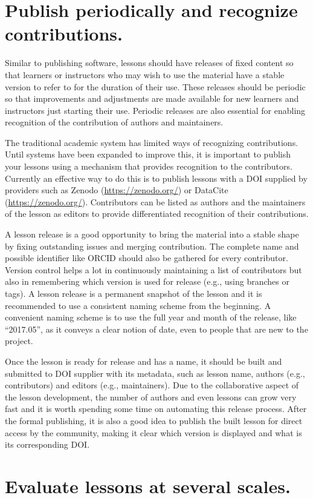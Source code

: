 \documentclass[10pt,letterpaper]{article}
\newcommand{\rulemajor}[1]{\section{#1}}
\begin{document}
\rulemajor{Publish periodically and recognize contributions.}

Similar to publishing software,
lessons should have releases of fixed content
so that learners or instructors who may wish to use the material have a stable version to refer to
for the duration of their use.
These releases should be periodic
so that improvements and adjustments are made available
for new learners and instructors just starting their use.
Periodic releases are also essential
for enabling recognition of the contribution of authors and maintainers.

The traditional academic system has limited ways of recognizing contributions.
Until systems have been expanded to improve this,
it is important to publish your lessons using a mechanism that provides recognition to the contributors.
Currently an effective way to do this is
to publish lessons with a DOI supplied by providers such as Zenodo (\url{https://zenodo.org/})
or DataCite (\url{https://zenodo.org/}).
Contributors can be listed as authors
and the maintainers of the lesson as editors
to provide differentiated recognition of their contributions.

A lesson release is a good opportunity to bring the material into a stable shape
by fixing outstanding issues and merging contribution.
The complete name and possible identifier like ORCID should also be gathered for every contributor.
Version control helps a lot in continuously maintaining a list of contributors
but also in remembering which version is used for release
(e.g., using branches or tags).
A lesson release is a permanent snapshot of the lesson
and it is recommended to use a consistent naming scheme from the beginning.
A convenient naming scheme is to use the full year and month of the release,
like ``2017.05'',
as it conveys a clear notion of date,
even to people that are new to the project.

Once the lesson is ready for release and has a name,
it should be built
and submitted to DOI supplier with its metadata,
such as lesson name, authors (e.g., contributors) and editors (e.g., maintainers).
Due to the collaborative aspect of the lesson development,
the number of authors and even lessons can grow very fast
and it is worth spending some time on automating this release process.
After the formal publishing,
it is also a good idea to publish the built lesson for direct access by the community,
making it clear which version is displayed and what is its corresponding DOI.

\rulemajor{Evaluate lessons at several scales.}
\end{document}
